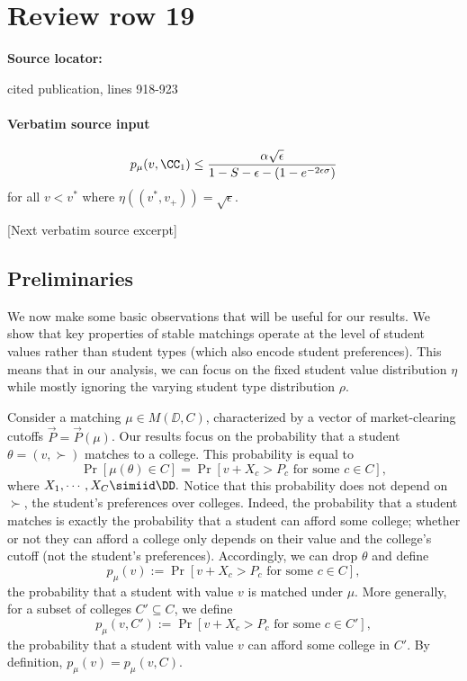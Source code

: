 \documentclass[10pt]{article}
\begin{document}
\section*{Review row 19}
\textbf{Source locator:} {\footnotesize\raggedright cited publication, lines 918-\allowbreak{}923\par}
\paragraph{Verbatim source input}
\begin{ReviewVerbatim}
\begin{proposition}\label{prop:lt-small-firms}
\begin{equation}
    p_\mu(v, \CC_1) \le \frac{\alpha\sqrt{\epsilon}}{1 - S - \epsilon - (1 - e^{-2\epsilon\sigma})}
\end{equation}
for all $v < v^*$ where $\eta((v^*, v_+))=\sqrt{\epsilon}.$
\end{proposition}

[Next verbatim source excerpt]

\subsection{Preliminaries}
We now make some basic observations that will be useful for our results. We show that key properties of stable matchings operate at the level of student values rather than student types (which also encode student preferences). This means that in our analysis, we can focus on the fixed student value distribution $\eta$ while mostly ignoring the varying student type distribution $\rho$.

Consider a matching $\mu\in M(\DD, C)$, characterized by a vector of market-clearing cutoffs $\vec{P}=\vec{P}(\mu)$. Our results focus on the probability that a student $\theta=(v,\succ)$ matches to a college. This probability is equal to
\begin{equation}
    \Pr[\mu(\theta)\in C] = \Pr[v + X_c > P_c\text{ for some $c\in C$}],
\end{equation}
where $X_1, \cdots, X_C \simiid \DD.$ Notice that this probability does not depend on $\succ$, the student's preferences over colleges. Indeed, the probability that a student matches is exactly the probability that a student can afford some college; whether or not they can afford a college only depends on their value and the college's cutoff (not the student's preferences). Accordingly, we can drop $\theta$ and define
\begin{equation}
    p_\mu(v) := \Pr[v + X_c > P_c\text{ for some $c\in C$}],
\end{equation}
the probability that a student with value $v$ is matched under $\mu$. More generally, for a subset of colleges $C'\subseteq C$, we define
\begin{equation}
    p_\mu(v, C') := \Pr[v + X_c > P_c\text{ for some $c\in C'$}],
\end{equation}
the probability that a student with value $v$ can afford some college in $C'$. By definition, $p_\mu(v) = p_\mu(v, C).$


\end{ReviewVerbatim}
\end{document}
